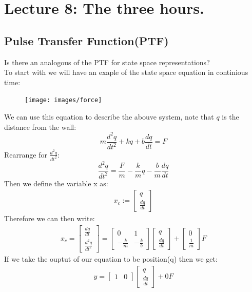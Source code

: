 \documentclass[a4paper,11pt]{article}
\begin{document}
\section{Lecture 8: The three hours.}
\subsection{Pulse Transfer Function(PTF)}
	Is there an analogous of the PTF for state space representations?\\
	To start with we will have an exaple of the state space equation in continious time:
	\begin{figure}[htp]
		\centering
		\texttt{[image: images/force]}
	\end{figure}
	\FloatBarrier
	We can use this equation to describe the abouve system, note that $q$ is the distance from the wall:
	\begin{equation}
		m\frac{d^2q}{dt^2} + kq + b\frac{dq}{dt} = F
	\end{equation}
	Rearrange for $\frac{d^2q}{dt^2}$:
	\begin{equation}
		\frac{d^2q}{dt^2}= \frac{F}{m}- \frac{k}{m}q - \frac{b}{m}\frac{dq}{dt}
	\end{equation}
	Then we define the variable x as:
	\begin{gather}
		x_c:=
 		\begin{bmatrix} q \\ \frac{dq}{dt}\end{bmatrix}
	\end{gather}
Therefore we can then write:
\begin{gather}
	x_c=
	\begin{bmatrix} \frac{dq}{dt} \\ \frac{d^2q}{dt^2}\end{bmatrix}
 =
  \begin{bmatrix}
	0 & 1 \\
	-\frac{k}{m}& -\frac{k}{b}
   \end{bmatrix}
  \begin{bmatrix} q \\ \frac{dq}{dt}\end{bmatrix} 
  +\begin{bmatrix} 0 \\ \frac{1}{m}\end{bmatrix}F
\end{gather}
If we take the ouptut of our equation to be position(q) then we get:
\begin{gather}
	y = \begin{bmatrix} 1 & 0\end{bmatrix}
	\begin{bmatrix} q \\ \frac{dq}{dt}\end{bmatrix} 
	+0F
\end{gather}
\end{document}
